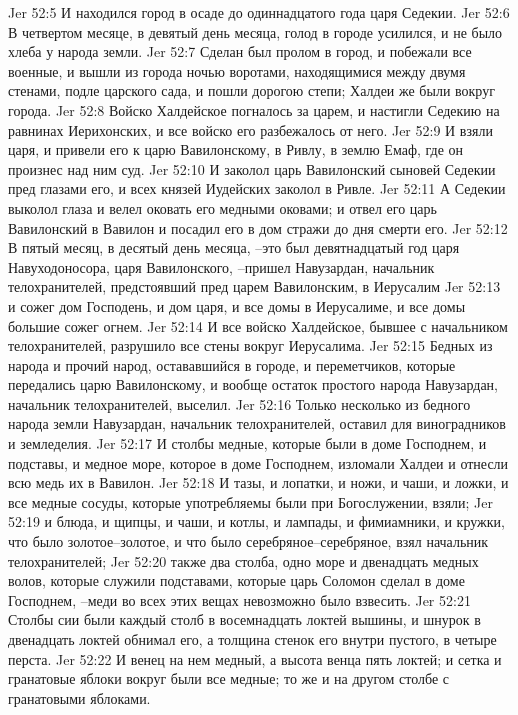 Jer 52:5  И находился город в осаде до одиннадцатого года царя Седекии.
Jer 52:6  В четвертом месяце, в девятый день месяца, голод в городе усилился, и не было хлеба у народа земли.
Jer 52:7  Сделан был пролом в город, и побежали все военные, и вышли из города ночью воротами, находящимися между двумя стенами, подле царского сада, и пошли дорогою степи; Халдеи же были вокруг города.
Jer 52:8  Войско Халдейское погналось за царем, и настигли Седекию на равнинах Иерихонских, и все войско его разбежалось от него.
Jer 52:9  И взяли царя, и привели его к царю Вавилонскому, в Ривлу, в землю Емаф, где он произнес над ним суд.
Jer 52:10  И заколол царь Вавилонский сыновей Седекии пред глазами его, и всех князей Иудейских заколол в Ривле.
Jer 52:11  А Седекии выколол глаза и велел оковать его медными оковами; и отвел его царь Вавилонский в Вавилон и посадил его в дом стражи до дня смерти его.
Jer 52:12  В пятый месяц, в десятый день месяца, --это был девятнадцатый год царя Навуходоносора, царя Вавилонского, --пришел Навузардан, начальник телохранителей, предстоявший пред царем Вавилонским, в Иерусалим
Jer 52:13  и сожег дом Господень, и дом царя, и все домы в Иерусалиме, и все домы большие сожег огнем.
Jer 52:14  И все войско Халдейское, бывшее с начальником телохранителей, разрушило все стены вокруг Иерусалима.
Jer 52:15  Бедных из народа и прочий народ, остававшийся в городе, и переметчиков, которые передались царю Вавилонскому, и вообще остаток простого народа Навузардан, начальник телохранителей, выселил.
Jer 52:16  Только несколько из бедного народа земли Навузардан, начальник телохранителей, оставил для виноградников и земледелия.
Jer 52:17  И столбы медные, которые были в доме Господнем, и подставы, и медное море, которое в доме Господнем, изломали Халдеи и отнесли всю медь их в Вавилон.
Jer 52:18  И тазы, и лопатки, и ножи, и чаши, и ложки, и все медные сосуды, которые употребляемы были при Богослужении, взяли;
Jer 52:19  и блюда, и щипцы, и чаши, и котлы, и лампады, и фимиамники, и кружки, что было золотое--золотое, и что было серебряное--серебряное, взял начальник телохранителей;
Jer 52:20  также два столба, одно море и двенадцать медных волов, которые служили подставами, которые царь Соломон сделал в доме Господнем, --меди во всех этих вещах невозможно было взвесить.
Jer 52:21  Столбы сии были каждый столб в восемнадцать локтей вышины, и шнурок в двенадцать локтей обнимал его, а толщина стенок его внутри пустого, в четыре перста.
Jer 52:22  И венец на нем медный, а высота венца пять локтей; и сетка и гранатовые яблоки вокруг были все медные; то же и на другом столбе с гранатовыми яблоками.
